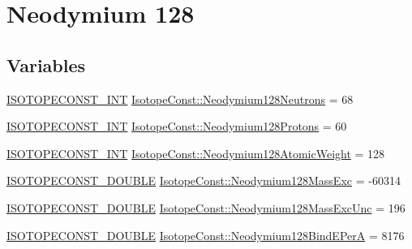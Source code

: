 \hypertarget{group___isotope_const-_neodymium-_nd128}{}\section{Neodymium 128}
\label{group___isotope_const-_neodymium-_nd128}
\subsection*{Variables}
\begin{DoxyCompactItemize}
\item 
\mbox{\hyperlink{group___isotope_const-_macros_ga5f18360b3e99483a35c32d789e62621c}{I\+S\+O\+T\+O\+P\+E\+C\+O\+N\+S\+T\+\_\+\+I\+NT}} \mbox{\hyperlink{group___isotope_const-_neodymium-_nd128_ga1f0d41cbdff27d37272df1147b207374}{Isotope\+Const\+::\+Neodymium128\+Neutrons}} = 68
\item 
\mbox{\hyperlink{group___isotope_const-_macros_ga5f18360b3e99483a35c32d789e62621c}{I\+S\+O\+T\+O\+P\+E\+C\+O\+N\+S\+T\+\_\+\+I\+NT}} \mbox{\hyperlink{group___isotope_const-_neodymium-_nd128_gafa3264e6e0f315b47805900c3030b6a1}{Isotope\+Const\+::\+Neodymium128\+Protons}} = 60
\item 
\mbox{\hyperlink{group___isotope_const-_macros_ga5f18360b3e99483a35c32d789e62621c}{I\+S\+O\+T\+O\+P\+E\+C\+O\+N\+S\+T\+\_\+\+I\+NT}} \mbox{\hyperlink{group___isotope_const-_neodymium-_nd128_ga41d161b20256e7f86a8e2bdfab8b71ba}{Isotope\+Const\+::\+Neodymium128\+Atomic\+Weight}} = 128
\item 
\mbox{\hyperlink{group___isotope_const-_macros_ga8f45a7272ce02c0b4c65c44636ed719a}{I\+S\+O\+T\+O\+P\+E\+C\+O\+N\+S\+T\+\_\+\+D\+O\+U\+B\+LE}} \mbox{\hyperlink{group___isotope_const-_neodymium-_nd128_ga3629c31ddd5c75641a0aafa8b78a7db3}{Isotope\+Const\+::\+Neodymium128\+Mass\+Exc}} = -\/60314
\item 
\mbox{\hyperlink{group___isotope_const-_macros_ga8f45a7272ce02c0b4c65c44636ed719a}{I\+S\+O\+T\+O\+P\+E\+C\+O\+N\+S\+T\+\_\+\+D\+O\+U\+B\+LE}} \mbox{\hyperlink{group___isotope_const-_neodymium-_nd128_gab25dffe500787673147b7583af666921}{Isotope\+Const\+::\+Neodymium128\+Mass\+Exc\+Unc}} = 196
\item 
\mbox{\hyperlink{group___isotope_const-_macros_ga8f45a7272ce02c0b4c65c44636ed719a}{I\+S\+O\+T\+O\+P\+E\+C\+O\+N\+S\+T\+\_\+\+D\+O\+U\+B\+LE}} \mbox{\hyperlink{group___isotope_const-_neodymium-_nd128_gaabc2f3d2063e3379255cd84d8231ae7e}{Isotope\+Const\+::\+Neodymium128\+Bind\+E\+PerA}} = 8176
\item 

\end{DoxyCompactItemize}
